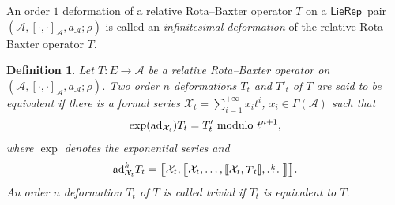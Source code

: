 \documentclass[10pt,a4paper]{amsart}
\numberwithin{equation}{section}
\newtheorem{defi}[thm]{Definition}
\newcommand{\huaA}{\mathcal{A}}
\newcommand{\huaX}{\mathcal{X}}
\newcommand{\ad}{\mathrm{ad}}
\newcommand{\LP}{$\mathsf{LieRep}$~}
\begin{document}
An order $1$ deformation of a relative Rota--Baxter operator $T$ on a \LP pair $(\huaA,[\cdot,\cdot]_\huaA,a_\huaA;\rho)$ is called an {\it infinitesimal deformation} of the relative Rota--Baxter operator $T$.



\begin{defi}%
Let $T\colon E\longrightarrow \huaA$ be a relative Rota--Baxter operator on $(\huaA,[\cdot,\cdot]_\huaA,a_\huaA;\rho)$. Two order $n$ deformations $T_t$ and $T'_t$ of $T$ are said to be {\it equivalent} if there is a formal series $\huaX_t=\sum_{i=1}^{+\infty}x_it^i$, $x_i\in \Gamma(\huaA) $ such that
\begin{gather}\label{eq:equivalent 2-1}
{\rm exp}(\ad_{\huaX_t})T_t=T_t' \mbox{ modulo } t^{n+1},
\end{gather}
 where ${\exp}$ denotes the exponential series and
\begin{gather*}
\ad^k_{\huaX_t}T_t=\big[\hspace{-3pt}\big[\huaX_t,\big[\hspace{-3pt}\big[\huaX_t,\dots,[\hspace{-1.5pt}[\huaX_t,\stackrel{}T_t
]\hspace{-1.5pt}],\stackrel{k}{\dots}\big]\hspace{-3pt}\big] \big]\hspace{-3pt}\big].
\end{gather*}
An order $n$ deformation $T_t$ of $T$ is called {\it trivial} if $T_t$ is equivalent to $T$.
\end{defi}
\end{document}
